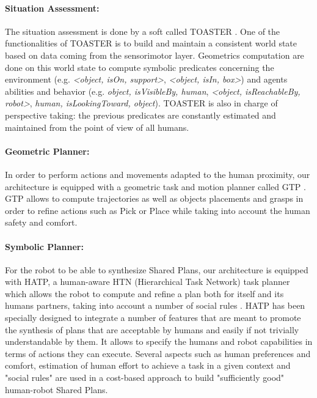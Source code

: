 \documentclass[english,a4paper,11pt,twoside]{StyleThese}
\begin{document}
\paragraph{Situation Assessment:}
The situation assessment is done by a soft called TOASTER \cite{milliezThesis}. One of the functionalities of TOASTER is to build and maintain a consistent world state based on data coming from the sensorimotor layer. Geometrics computation are done on this world state to compute symbolic predicates concerning the environment (e.g. \textit{<object, isOn, support>}, \textit{<object, isIn, box>}) and agents abilities and behavior (e.g. \textit{object, isVisibleBy, human}, \textit{<object, isReachableBy, robot>}, \textit{human, isLookingToward, object}). TOASTER is also in charge of perspective taking: the previous predicates are constantly estimated and maintained from the point of view of all humans.

\paragraph{Geometric Planner:}
In order to perform actions and movements adapted to the human proximity, our architecture is equipped with a geometric task and motion planner called GTP \cite{waldhart2016novel}. GTP allows to compute trajectories as well as objects placements and grasps in order to refine actions such as Pick or Place while taking into account the human safety and comfort.

\paragraph{Symbolic Planner:}
For the robot to be able to synthesize Shared Plans, our architecture is equipped with HATP, a human-aware HTN (Hierarchical Task Network) task planner which allows the robot to compute and refine a plan both for itself and its humans partners, taking into account a number of social rules \cite{Lallement2014hatp}.
HATP has been specially designed to integrate a number of features that are meant to promote the synthesis of plans that are acceptable by humans and easily if not trivially understandable by them. It allows to specify the humans and robot capabilities in terms of actions they can execute. Several aspects such as human preferences and comfort, estimation of human effort to achieve a task in a given context and "social rules" are used in a cost-based approach to build "sufficiently good" human-robot Shared Plans.
\end{document}
